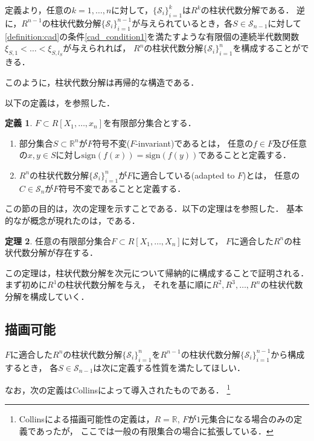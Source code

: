 \documentclass[uplatex, dvipdfmx]{jsarticle}
\numberwithin{equation}{section}
\newcommand{\R}{\mathbb{R}}
\newcommand{\calS}{\mathcal{S}}
\newcommand{\sign}{\mathrm{sign}}
\theoremstyle{definition}
\newtheorem{definition}{定義}[section]
\newtheorem{theorem}[definition]{定理}
\begin{document}
定義より，任意の$k=1, \dots, n$に対して，$\{\calS_i\}_{i=1}^k$は$R^k$の柱状代数分解である．
逆に，$R^{n-1}$の柱状代数分解$\{\calS_i\}_{i=1}^{n-1}$が与えられているとき，各$S \in \calS_{n-1}$に対して
\cref{definition:cad}の条件\ref{cad_condition1}を満たすような有限個の連続半代数関数$\xi_{S,1}<\dots<\xi_{S,l_S}$が与えられれば，
$R^n$の柱状代数分解$\{\calS_i\}_{i=1}^n$を構成することができる．

このように，柱状代数分解は再帰的な構造である．

以下の定義は，\cite[Definition 5.5]{MR2248869}を参照した．
\begin{definition}
     $F \subset R[X_1, \dots, x_n]$を有限部分集合とする．
     \begin{enumerate}
          \item 部分集合$S \subset \R^n$が$F$符号不変($F$-invariant)であるとは，
          任意の$f \in F$及び任意の$x,y \in S$に対し$\sign(f(x))=\sign(f(y))$であることと定義する．

          \item $R^n$の柱状代数分解$\{\calS_i\}_{i=1}^n$が$F$に適合している(adapted to $F$)とは，
          任意の$C \in \calS_n$が$F$符号不変であることと定義する．
     \end{enumerate}
\end{definition}

この節の目的は，次の定理を示すことである．以下の定理は\cite[Theorem 5.6]{MR2248869}を参照した．
基本的なが概念が現れたのは，\cite{MR0403962}である．
\begin{theorem} \label{theorem:cad}
     任意の有限部分集合$F \subset R[X_1, \dots, X_n]$に対して，
     $F$に適合した$R^n$の柱状代数分解が存在する．
\end{theorem}

この定理は，柱状代数分解を次元について帰納的に構成することで証明される．
まず初めに$R^1$の柱状代数分解を与え，
それを基に順に$R^2, R^3, \dots, R^n$の柱状代数分解を構成していく．

\subsection{描画可能}
$F$に適合した$R^n$の柱状代数分解$\{\calS_i\}_{i=1}^n$を$R^{n-1}$の柱状代数分解$\{\calS_i\}_{i=1}^{n-1}$から構成するとき，
各$S \in \calS_{n-1}$は次に定義する性質を満たしてほしい．

なお，次の定義はCollins\cite{MR0403962}によって導入されたものである．
\footnote{
     Collins\cite{MR0403962}による描画可能性の定義は，$R=\R$, $F$が$1$元集合になる場合のみの定義であったが，
     ここでは一般の有限集合の場合に拡張している．
}
\end{document}
